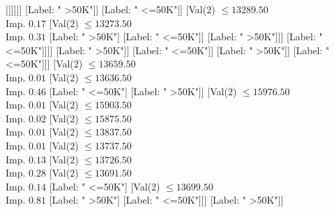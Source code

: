 \documentclass[margin=10pt]{standalone}
\begin{document}
\begin{forest}
																																								[Label: " >50K"]
																																								[Val($2$) $ \leq 12900.50$ \\ Imp. $0.06$
																																									[Label: " <=50K"]
																																									[Val($2$) $ \leq 12919.50$ \\ Imp. $0.28$
																																										[Label: " >50K"]
																																										[Label: " <=50K"]]]]]]]
																																				[Label: " >50K"]]
																																			[Label: " <=50K"]]
																																		[Val($2$) $ \leq 13289.50$ \\ Imp. $0.17$
																																			[Val($2$) $ \leq 13273.50$ \\ Imp. $0.31$
																																				[Label: " >50K"]
																																				[Label: " <=50K"]]
																																			[Label: " >50K"]]]
																																	[Label: " <=50K"]]]]
																														[Label: " >50K"]]
																													[Label: " <=50K"]]
																												[Label: " >50K"]]
																											[Label: " <=50K"]]]
																									[Val($2$) $ \leq 13659.50$ \\ Imp. $0.01$
																										[Val($2$) $ \leq 13636.50$ \\ Imp. $0.46$
																											[Label: " <=50K"]
																											[Label: " >50K"]]
																										[Val($2$) $ \leq 15976.50$ \\ Imp. $0.01$
																											[Val($2$) $ \leq 15903.50$ \\ Imp. $0.02$
																												[Val($2$) $ \leq 15875.50$ \\ Imp. $0.01$
																													[Val($2$) $ \leq 13837.50$ \\ Imp. $0.01$
																														[Val($2$) $ \leq 13737.50$ \\ Imp. $0.13$
																															[Val($2$) $ \leq 13726.50$ \\ Imp. $0.28$
																																[Val($2$) $ \leq 13691.50$ \\ Imp. $0.14$
																																	[Label: " <=50K"]
																																	[Val($2$) $ \leq 13699.50$ \\ Imp. $0.81$
																																		[Label: " >50K"]
																																		[Label: " <=50K"]]]
																																[Label: " >50K"]]

\end{forest}
\end{document}
